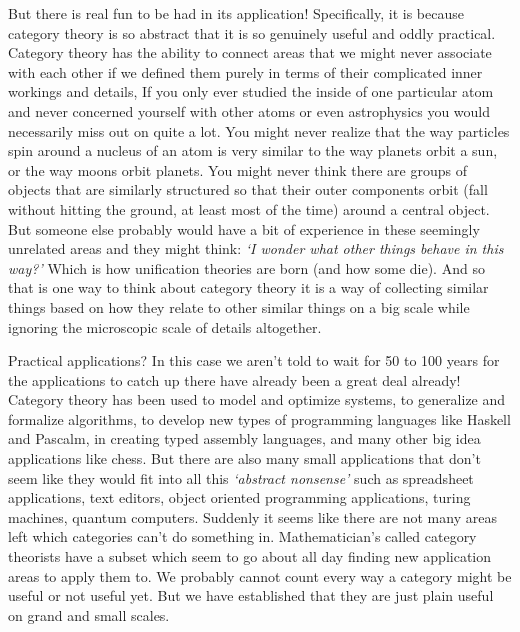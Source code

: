 But there is real fun to be had in its application! Specifically, it is because category theory is so abstract that it is so genuinely useful and oddly practical. Category theory has the ability to connect areas that we might never associate with each other if we defined them purely in terms of their complicated inner workings and details, If you only ever studied the inside of one particular atom and never concerned yourself with other atoms or even astrophysics you would necessarily miss out on quite a lot. You might never realize that the way particles spin around a nucleus of an atom is very similar to the way planets orbit a sun, or the way moons orbit planets. You might never think there are groups of objects that are similarly structured so that their outer components orbit (fall without hitting the ground, at least most of the time) around a central object. But someone else probably would have a bit of experience in these seemingly unrelated areas and they might think: \emph{`I wonder what other things behave in this way?'} Which is how unification theories are born (and how some die). And so that is one way to think about category theory it is a way of collecting similar things based on how they relate to other similar things on a big scale while ignoring the microscopic scale of details altogether. 

Practical applications? In this case we aren't told to wait for 50 to 100 years for the applications to catch up there have already been a great deal already! Category theory has been used to model and optimize systems, to generalize and formalize algorithms, to develop new types of programming languages like Haskell and Pascalm, in creating typed assembly languages, and many other big idea applications like chess. But there are also many small applications that don't seem like they would fit into all this \emph{`abstract nonsense'} such as spreadsheet applications, text editors, object oriented programming applications, turing machines, quantum computers. Suddenly it seems like there are not many areas left which categories can't do something in. Mathematician's called category theorists have a subset which seem to go about all day finding new application areas to apply them to. We probably cannot count every way a category might be useful or not useful yet. But we have established that they are just plain useful on grand and small scales. 